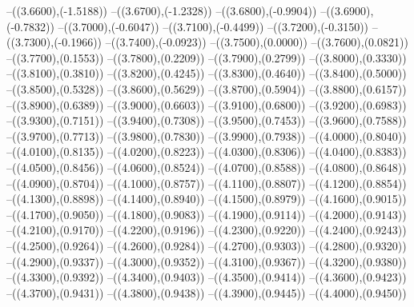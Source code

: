 {	--({\sx*(3.6600)},{\sy*(-1.5188)})
	--({\sx*(3.6700)},{\sy*(-1.2328)})
	--({\sx*(3.6800)},{\sy*(-0.9904)})
	--({\sx*(3.6900)},{\sy*(-0.7832)})
	--({\sx*(3.7000)},{\sy*(-0.6047)})
	--({\sx*(3.7100)},{\sy*(-0.4499)})
	--({\sx*(3.7200)},{\sy*(-0.3150)})
	--({\sx*(3.7300)},{\sy*(-0.1966)})
	--({\sx*(3.7400)},{\sy*(-0.0923)})
	--({\sx*(3.7500)},{\sy*(0.0000)})
	--({\sx*(3.7600)},{\sy*(0.0821)})
	--({\sx*(3.7700)},{\sy*(0.1553)})
	--({\sx*(3.7800)},{\sy*(0.2209)})
	--({\sx*(3.7900)},{\sy*(0.2799)})
	--({\sx*(3.8000)},{\sy*(0.3330)})
	--({\sx*(3.8100)},{\sy*(0.3810)})
	--({\sx*(3.8200)},{\sy*(0.4245)})
	--({\sx*(3.8300)},{\sy*(0.4640)})
	--({\sx*(3.8400)},{\sy*(0.5000)})
	--({\sx*(3.8500)},{\sy*(0.5328)})
	--({\sx*(3.8600)},{\sy*(0.5629)})
	--({\sx*(3.8700)},{\sy*(0.5904)})
	--({\sx*(3.8800)},{\sy*(0.6157)})
	--({\sx*(3.8900)},{\sy*(0.6389)})
	--({\sx*(3.9000)},{\sy*(0.6603)})
	--({\sx*(3.9100)},{\sy*(0.6800)})
	--({\sx*(3.9200)},{\sy*(0.6983)})
	--({\sx*(3.9300)},{\sy*(0.7151)})
	--({\sx*(3.9400)},{\sy*(0.7308)})
	--({\sx*(3.9500)},{\sy*(0.7453)})
	--({\sx*(3.9600)},{\sy*(0.7588)})
	--({\sx*(3.9700)},{\sy*(0.7713)})
	--({\sx*(3.9800)},{\sy*(0.7830)})
	--({\sx*(3.9900)},{\sy*(0.7938)})
	--({\sx*(4.0000)},{\sy*(0.8040)})
	--({\sx*(4.0100)},{\sy*(0.8135)})
	--({\sx*(4.0200)},{\sy*(0.8223)})
	--({\sx*(4.0300)},{\sy*(0.8306)})
	--({\sx*(4.0400)},{\sy*(0.8383)})
	--({\sx*(4.0500)},{\sy*(0.8456)})
	--({\sx*(4.0600)},{\sy*(0.8524)})
	--({\sx*(4.0700)},{\sy*(0.8588)})
	--({\sx*(4.0800)},{\sy*(0.8648)})
	--({\sx*(4.0900)},{\sy*(0.8704)})
	--({\sx*(4.1000)},{\sy*(0.8757)})
	--({\sx*(4.1100)},{\sy*(0.8807)})
	--({\sx*(4.1200)},{\sy*(0.8854)})
	--({\sx*(4.1300)},{\sy*(0.8898)})
	--({\sx*(4.1400)},{\sy*(0.8940)})
	--({\sx*(4.1500)},{\sy*(0.8979)})
	--({\sx*(4.1600)},{\sy*(0.9015)})
	--({\sx*(4.1700)},{\sy*(0.9050)})
	--({\sx*(4.1800)},{\sy*(0.9083)})
	--({\sx*(4.1900)},{\sy*(0.9114)})
	--({\sx*(4.2000)},{\sy*(0.9143)})
	--({\sx*(4.2100)},{\sy*(0.9170)})
	--({\sx*(4.2200)},{\sy*(0.9196)})
	--({\sx*(4.2300)},{\sy*(0.9220)})
	--({\sx*(4.2400)},{\sy*(0.9243)})
	--({\sx*(4.2500)},{\sy*(0.9264)})
	--({\sx*(4.2600)},{\sy*(0.9284)})
	--({\sx*(4.2700)},{\sy*(0.9303)})
	--({\sx*(4.2800)},{\sy*(0.9320)})
	--({\sx*(4.2900)},{\sy*(0.9337)})
	--({\sx*(4.3000)},{\sy*(0.9352)})
	--({\sx*(4.3100)},{\sy*(0.9367)})
	--({\sx*(4.3200)},{\sy*(0.9380)})
	--({\sx*(4.3300)},{\sy*(0.9392)})
	--({\sx*(4.3400)},{\sy*(0.9403)})
	--({\sx*(4.3500)},{\sy*(0.9414)})
	--({\sx*(4.3600)},{\sy*(0.9423)})
	--({\sx*(4.3700)},{\sy*(0.9431)})
	--({\sx*(4.3800)},{\sy*(0.9438)})
	--({\sx*(4.3900)},{\sy*(0.9445)})
	--({\sx*(4.4000)},{\sy*(0.9450)})
}
